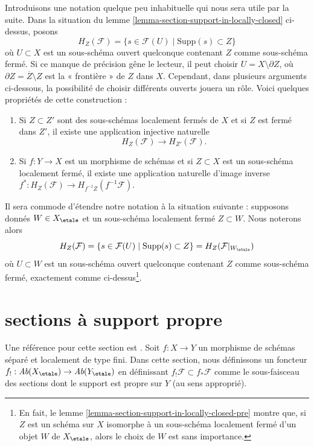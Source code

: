 \noindent
Introduisons une notation quelque peu inhabituelle qui nous sera
utile par la suite. Dans la situation du
lemme \ref{lemma-section-support-in-locally-closed} ci-dessus, posons
$$
H_Z(\mathcal{F}) = \{s \in \mathcal{F}(U) \mid \text{Supp}(s) \subset Z\}
$$
où $U \subset X$ est un sous-schéma ouvert quelconque contenant $Z$ comme
sous-schéma fermé. Si ce manque de précision gêne le lecteur, il peut
choisir $U = X \setminus \partial Z$, où
$\partial Z = \overline{Z}\setminus Z$ est la « frontière » de $Z$ dans $X$.
Cependant, dans plusieurs arguments ci-dessous, la possibilité de choisir
différents ouverts jouera un rôle. Voici quelques propriétés de cette
construction :
\begin{enumerate}
\item
\label{item-inclusion}
Si $Z \subset Z'$ sont des sous-schémas localement fermés de $X$ et si $Z$ est
fermé dans $Z'$, il existe une application injective naturelle
$$
H_Z(\mathcal{F}) \to H_{Z'}(\mathcal{F}).
$$
\item
\label{item-pullback}
Si $f : Y \to X$ est un morphisme de schémas et si $Z \subset X$ est un
sous-schéma localement fermé, il existe une application naturelle
d'image inverse $f^* : H_Z(\mathcal{F}) \to H_{f^{-1}Z}(f^{-1}\mathcal{F})$.
\end{enumerate}
Il sera commode d'étendre notre notation à la situation suivante :
supposons donnés $W \in X_\etale$ et un sous-schéma localement fermé
$Z \subset W$. Nous noterons alors
$$
H_Z(\mathcal{F}) =
\{s \in \mathcal{F}(U) \mid \text{Supp}(s) \subset Z\} =
H_Z(\mathcal{F}|_{W_\etale})
$$
où $U \subset W$ est un sous-schéma ouvert quelconque contenant $Z$
comme sous-schéma fermé, exactement comme ci-dessus\footnote{En fait, le
lemme \ref{lemma-section-support-in-locally-closed-pre}
montre que, si $Z$ est un schéma sur $X$ isomorphe à un sous-schéma
localement fermé d'un objet $W$ de $X_\etale$, alors
le choix de $W$ est sans importance.}.







\section{sections à support propre}
\label{section-compact-support}

\noindent
Une référence pour cette section est \cite[Exposé XVII, section 6]{SGA4}.
Soit $f : X \to Y$ un morphisme de schémas séparé et
localement de type fini. Dans cette section, nous définissons un foncteur
$f_! : \textit{Ab}(X_\etale) \to \textit{Ab}(Y_\etale)$
en définissant $f_!\mathcal{F} \subset f_*\mathcal{F}$ comme
le sous-faisceau des sections dont le support est propre sur $Y$
(au sens approprié).


